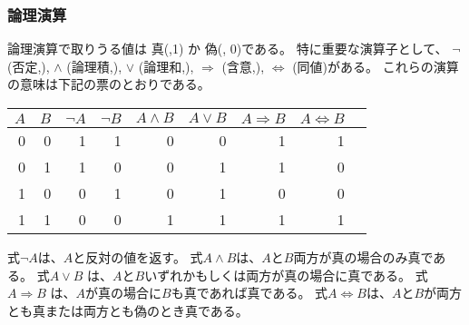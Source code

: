 \subsubsection{論理演算}


\begin{comment}
The value of a logical expression is either
\key{true} (1) or \key{false} (0).
The most important logical operators are
$\lnot$ (\key{negation}),
$\land$ (\key{conjunction}),
$\lor$ (\key{disjunction}),
$\Rightarrow$ (\key{implication}) and
$\Leftrightarrow$ (\key{equivalence}).
The following table shows the meanings of these operators:
\end{comment}

論理演算で取りうる値は
真(,1) か 偽(, 0)である。
特に重要な演算子として、
$\lnot$ (否定,),
$\land$ (論理積,),
$\lor$ (論理和,),
$\Rightarrow$ (含意,),
$\Leftrightarrow$ (同値)がある。
これらの演算の意味は下記の票のとおりである。

\begin{center}
\begin{tabular}{rr|rrrrrrr}
$A$ & $B$ & $\lnot A$ & $\lnot B$ & $A \land B$ & $A \lor B$ & $A \Rightarrow B$ & $A \Leftrightarrow B$ \\
\hline
0 & 0 & 1 & 1 & 0 & 0 & 1 & 1 \\
0 & 1 & 1 & 0 & 0 & 1 & 1 & 0 \\
1 & 0 & 0 & 1 & 0 & 1 & 0 & 0 \\
1 & 1 & 0 & 0 & 1 & 1 & 1 & 1 \\
\end{tabular}
\end{center}

\begin{comment}
The expression $\lnot A$ has the opposite value of $A$.
The expression $A \land B$ is true if both $A$ and $B$
are true,
and the expression $A \lor B$ is true if $A$ or $B$ or both
are true.
The expression $A \Rightarrow B$ is true
if whenever $A$ is true, also $B$ is true.
The expression $A \Leftrightarrow B$ is true
if $A$ and $B$ are both true or both false.
\end{comment}

式$\lnot A$は、$A$と反対の値を返す。
式$A \land B$は、$A$と$B$両方が真の場合のみ真である。
式$A \lor B$ は、$A$と$B$いずれかもしくは両方が真の場合に真である。
式$A \Rightarrow B$ は、$A$が真の場合に$B$も真であれば真である。
式$A \Leftrightarrow B$は、$A$と$B$が両方とも真または両方とも偽のとき真である。

